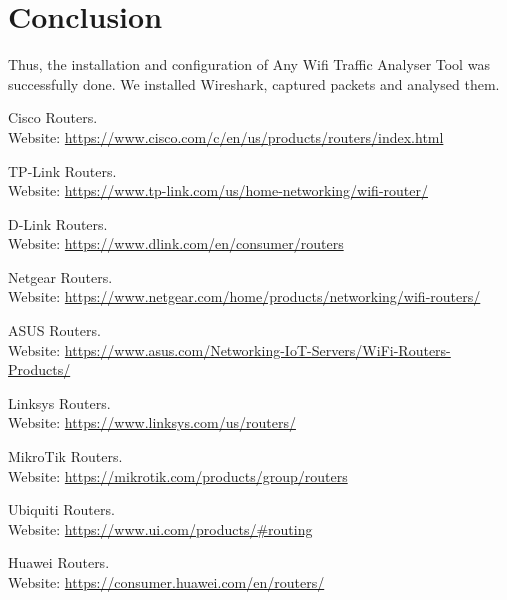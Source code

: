 \documentclass[11pt]{article}
\begin{document}
\section{Conclusion}
Thus, the installation and configuration of Any Wifi Traffic Analyser Tool was successfully done. We installed Wireshark, captured packets and analysed them. 
\clearpage
\begin{thebibliography}{99}
    Cisco Routers. \\
    Website: \url{https://www.cisco.com/c/en/us/products/routers/index.html}
  
    TP-Link Routers. \\
    Website: \url{https://www.tp-link.com/us/home-networking/wifi-router/}
  
    D-Link Routers. \\
    Website: \url{https://www.dlink.com/en/consumer/routers}
  
    Netgear Routers. \\
    Website: \url{https://www.netgear.com/home/products/networking/wifi-routers/}
  
    ASUS Routers. \\
    Website: \url{https://www.asus.com/Networking-IoT-Servers/WiFi-Routers-Products/}
  
    Linksys Routers. \\
    Website: \url{https://www.linksys.com/us/routers/}
  
    MikroTik Routers. \\
    Website: \url{https://mikrotik.com/products/group/routers}
  
    Ubiquiti Routers. \\
    Website: \url{https://www.ui.com/products/#routing}
  
    Huawei Routers. \\
    Website: \url{https://consumer.huawei.com/en/routers/}
  \end{thebibliography}
  
\end{document}
